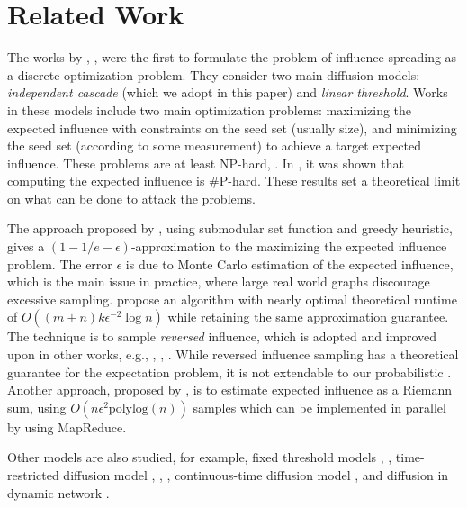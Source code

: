 \vspace{-0.1in}
\section{Related Work}
\label{sec:related}
The works by \cite{kkt-2003}, \cite{v011a004}, were the first to formulate the problem of influence
spreading as a discrete
optimization problem. They consider two main diffusion models: \textit{independent cascade} (which we adopt in this paper) and
\textit{linear threshold}. Works in these models
include two main optimization problems: maximizing the expected influence with constraints on the
seed set (usually size), and minimizing the seed set (according to some measurement) to achieve a target expected
influence. These problems are at least NP-hard, \cite{v011a004}. In \cite{chen2010scalable}, it
was shown that computing the expected influence is \#P-hard. These results set a theoretical limit
on what can be done to attack the problems.

The approach proposed by \cite{kkt-2003}, using submodular
set function and greedy heuristic, gives a $(1-1/e-\epsilon)$-approximation to the maximizing the expected
influence problem. The error $\epsilon$ is due to Monte Carlo estimation of the expected
influence, which is the main issue in practice, where large real world graphs discourage
excessive sampling. \cite{borgs2014maximizing} propose an algorithm with
nearly optimal theoretical runtime of $O((m+n)k\epsilon^{-2}\log n)$ while retaining the same
approximation guarantee. The technique is to sample \textit{reversed} influence, which is adopted
and improved upon in other works, e.g., \cite{tang2014influence}, \cite{tang2015influence},
\cite{nguyen2016stop}. While reversed influence sampling has a theoretical guarantee for the
expectation problem, it is not extendable to our probabilistic \mdelta.
Another approach, proposed by \cite{lucier:kdd15}, is to
estimate expected influence as a Riemann sum, using $O(n \epsilon^2 \text{polylog}(n))$ samples
which can be implemented in  parallel by using MapReduce.

Other models are also studied, for example, fixed threshold models \cite{chen2009approximability},
\cite{goldberg2013diffusion}, time-restricted diffusion model
\cite{goyal2013minimizing}, \cite{chen2012time}, \cite{dinh2014cost},
continuous-time diffusion model
\cite{du2013scalable}, and diffusion in dynamic network \cite{tong2017adaptive}.

